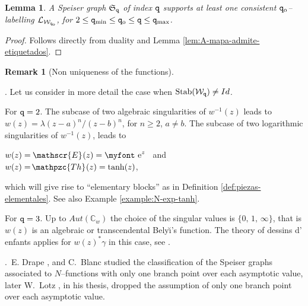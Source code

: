 \documentclass[final,3p,times]{elsarticle}
\newcommand{\CC}{\ensuremath{{\mathbb C}}}
\newcommand{\e}{{\text{\myfont e}}}
\newcommand{\ent}[2]{{}_{#1}\hspace{-1pt}\mathscr{E}_{#2}}
\newcommand{\htan}[2]{{}_{#1}\hspace{-2pt}\mathpzc{Th}_{#2}}    %
\newtheorem{lemma}[theorem]{Lemma}
\theoremstyle{definition}
\newtheorem{remark}[theorem]{Remark}
\begin{document}
\begin{lemma}
\label{lem:Speiser-graph-admite-etiquetados}
A Speiser graph $\mathfrak{S}_{\tt q}$ of index $\tt q$ 
supports at least one consistent 
${\tt q}_{\rm o}$--labelling $\mathcal{L}_{\mathcal{W}_{{\tt q}_{\rm o}}}$, for 
$2 \leq {\tt q}_{\text{min}} \leq {\tt q}_{\rm o} \leq {\tt q} \leq {\tt q}_{\text{max}}$.
\end{lemma}

\begin{proof}
Follows directly from duality and Lemma \ref{lem:A-mapa-admite-etiquetados}.
\end{proof}


\begin{remark}[Non uniqueness of the functions]
\label{rem:no-unicidad}
\hfill

.
Let us consider in more detail the case when $\text{Stab}(\mathcal{W}_{\tt q})\neq Id$.

\noindent
For ${\tt q}=2$. The subcase of two algebraic singularities
of $w^{-1}(z)$ leads to $w(z)=\lambda(z-a)^n/(z-b)^n$, for
$n \geq 2$, $a\neq b$. 
The subcase of two logarithmic singularities of
$w^{-1}(z)$, leads to 

\centerline{
$w(z)=\ent{}{} (z)=\e^{z}$ \ and \ $w(z)=\htan{}{} (z)=\tanh(z)$,
}

\noindent 
which will give rise to ``elementary blocks'' as in Definition \ref{def:piezas-elementales}.  
See also Example \ref{example:N-exp-tanh}.

\noindent
For ${\tt q}=3$. Up to $Aut(\CC_w)$ the choice of the 
singular values
is $\{0,\, 1,\, \infty \}$, that is $w(z)$ is an algebraic
or transcendental Bely{\u \i}'s function. The theory 
of dessins d' enfants applies for $w(z)^*\gamma$ in this case, 
see \cite{Jones-Wolfart}.

.\ 
E. Drape \cite{Drape}, and C.\ Blanc \cite{Blanc} studied the classification of the Speiser graphs 
associated to $N$--functions with only one branch point over each asymptotic value, 
later W.\ Lotz \cite{Lotz}, in his thesis, dropped the assumption of only one branch point 
over each asymptotic value. 


\end{remark}
\end{document}
